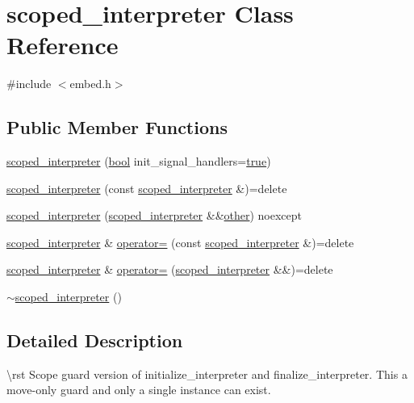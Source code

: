 \hypertarget{classscoped__interpreter}{}\section{scoped\+\_\+interpreter Class Reference}
\label{classscoped__interpreter}


{\ttfamily \#include $<$embed.\+h$>$}

\subsection*{Public Member Functions}
\begin{DoxyCompactItemize}
\item 
\mbox{\hyperlink{classscoped__interpreter_a6ba04e4795ec864e8e23289819225bef}{scoped\+\_\+interpreter}} (\mbox{\hyperlink{asdl_8h_af6a258d8f3ee5206d682d799316314b1}{bool}} init\+\_\+signal\+\_\+handlers=\mbox{\hyperlink{asdl_8h_af6a258d8f3ee5206d682d799316314b1a08f175a5505a10b9ed657defeb050e4b}{true}})
\item 
\mbox{\hyperlink{classscoped__interpreter_a794109d4db2ba5daf345b9262b85ec3e}{scoped\+\_\+interpreter}} (const \mbox{\hyperlink{classscoped__interpreter}{scoped\+\_\+interpreter}} \&)=delete
\item 
\mbox{\hyperlink{classscoped__interpreter_ac3d62f9f0065b0a627367d88d3ee38e9}{scoped\+\_\+interpreter}} (\mbox{\hyperlink{classscoped__interpreter}{scoped\+\_\+interpreter}} \&\&\mbox{\hyperlink{dictobject_8h_abd4733e17e86acb453bda62bc8b96adf}{other}}) noexcept
\item 
\mbox{\hyperlink{classscoped__interpreter}{scoped\+\_\+interpreter}} \& \mbox{\hyperlink{classscoped__interpreter_a7843ed2ad5cf5c54537373c1febec3c7}{operator=}} (const \mbox{\hyperlink{classscoped__interpreter}{scoped\+\_\+interpreter}} \&)=delete
\item 
\mbox{\hyperlink{classscoped__interpreter}{scoped\+\_\+interpreter}} \& \mbox{\hyperlink{classscoped__interpreter_acdda686792144d2fb682491d19a803b5}{operator=}} (\mbox{\hyperlink{classscoped__interpreter}{scoped\+\_\+interpreter}} \&\&)=delete
\item 
\mbox{\hyperlink{classscoped__interpreter_a482334b3d598cfffa28d4efa8a1bb3e9}{$\sim$scoped\+\_\+interpreter}} ()
\end{DoxyCompactItemize}


\subsection{Detailed Description}
\textbackslash{}rst Scope guard version of {\ttfamily initialize\+\_\+interpreter} and {\ttfamily finalize\+\_\+interpreter}. This a move-\/only guard and only a single instance can exist.

